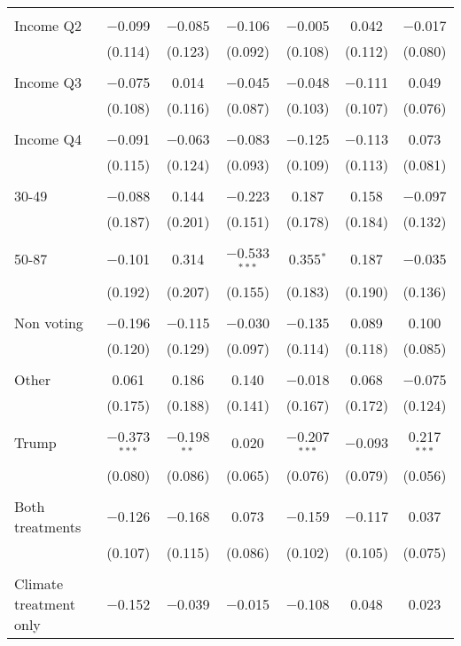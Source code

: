 \begin{tabular}{@{\extracolsep{5pt}}lcccccc}
  & & & & & & \\ 
 Income Q2 & $-$0.099 & $-$0.085 & $-$0.106 & $-$0.005 & 0.042 & $-$0.017 \\ 
  & (0.114) & (0.123) & (0.092) & (0.108) & (0.112) & (0.080) \\ 
  & & & & & & \\ 
 Income Q3 & $-$0.075 & 0.014 & $-$0.045 & $-$0.048 & $-$0.111 & 0.049 \\ 
  & (0.108) & (0.116) & (0.087) & (0.103) & (0.107) & (0.076) \\ 
  & & & & & & \\ 
 Income Q4 & $-$0.091 & $-$0.063 & $-$0.083 & $-$0.125 & $-$0.113 & 0.073 \\ 
  & (0.115) & (0.124) & (0.093) & (0.109) & (0.113) & (0.081) \\ 
  & & & & & & \\ 
 30-49 & $-$0.088 & 0.144 & $-$0.223 & 0.187 & 0.158 & $-$0.097 \\ 
  & (0.187) & (0.201) & (0.151) & (0.178) & (0.184) & (0.132) \\ 
  & & & & & & \\ 
 50-87 & $-$0.101 & 0.314 & $-$0.533$^{***}$ & 0.355$^{*}$ & 0.187 & $-$0.035 \\ 
  & (0.192) & (0.207) & (0.155) & (0.183) & (0.190) & (0.136) \\ 
  & & & & & & \\ 
 Non voting & $-$0.196 & $-$0.115 & $-$0.030 & $-$0.135 & 0.089 & 0.100 \\ 
  & (0.120) & (0.129) & (0.097) & (0.114) & (0.118) & (0.085) \\ 
  & & & & & & \\ 
 Other & 0.061 & 0.186 & 0.140 & $-$0.018 & 0.068 & $-$0.075 \\ 
  & (0.175) & (0.188) & (0.141) & (0.167) & (0.172) & (0.124) \\ 
  & & & & & & \\ 
 Trump & $-$0.373$^{***}$ & $-$0.198$^{**}$ & 0.020 & $-$0.207$^{***}$ & $-$0.093 & 0.217$^{***}$ \\ 
  & (0.080) & (0.086) & (0.065) & (0.076) & (0.079) & (0.056) \\ 
  & & & & & & \\ 
 Both treatments & $-$0.126 & $-$0.168 & 0.073 & $-$0.159 & $-$0.117 & 0.037 \\ 
  & (0.107) & (0.115) & (0.086) & (0.102) & (0.105) & (0.075) \\ 
  & & & & & & \\ 
 Climate treatment only & $-$0.152 & $-$0.039 & $-$0.015 & $-$0.108 & 0.048 & 0.023 \\ 

\end{tabular}
